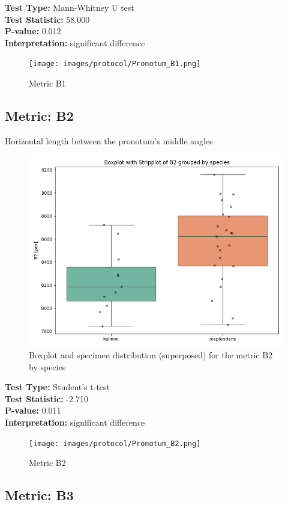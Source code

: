 \noindent\textbf{Test Type:} Mann-Whitney U test \\
\noindent\textbf{Test Statistic:} 58.000 \\
\noindent\textbf{P-value:} 0.012 \\
\noindent\textbf{Interpretation:} significant difference

\begin{figure}[H]
\centering
\texttt{[image: images/protocol/Pronotum\_B1.png]}
\caption{ Metric B1}
\end{figure}

\newpage
\subsection*{Metric: B2}

Horizontal length between the pronotum’s middle angles

\begin{figure}[H]
\centering
\includegraphics[width=0.7\linewidth]{images/boxplot/boxplot_B2.png}
\caption{  Boxplot and specimen distribution (superposed) for the metric  B2 by species}
\end{figure}

\noindent\textbf{Test Type:} Student's t-test \\
\noindent\textbf{Test Statistic:} -2.710 \\
\noindent\textbf{P-value:} 0.011 \\
\noindent\textbf{Interpretation:} significant difference

\begin{figure}[H]
\centering
\texttt{[image: images/protocol/Pronotum\_B2.png]}
\caption{ Metric B2}
\end{figure}

\newpage
\subsection*{Metric: B3}


